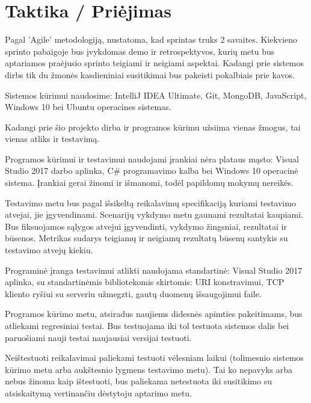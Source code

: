 \section{Taktika / Priėjimas}

Pagal 'Agile' metodologiją, nustatoma, kad sprintas truks 2 savaites.
Kiekvieno sprinto pabaigoje bus įvykdomas demo ir retrospektyvos,
kurių metu bus aptariamos praėjusio sprinto teigiami ir neigiami aspektai.
Kadangi prie sistemos dirbs tik du žmonės kasdieniniai susitikimai bus pakeisti pokalbiais prie kavos.

Sistemos kūrimui naudosime: IntelliJ IDEA Ultimate, Git, MongoDB, JavaScript, Windows 10 bei Ubuntu operacines sistemas.













Kadangi prie šio projekto dirba ir programos kūrimu užsiima vienas žmogus, tai vienas atliks ir testavimą.

Programos kūrimui ir testavimui naudojami įrankiai nėra plataus mąsto: Visual Studio 2017 darbo aplinka, C\# programavimo kalba bei Windows 10 operacinė sistema. 
Įrankiai gerai žinomi ir išmanomi, todėl papildomų mokymų nereikės. 

Testavimo metu bus pagal išsikeltą reikalavimų specifikaciją kuriami testavimo atvejai, jie įgyvendinami. 
Scenarijų vykdymo metu gaunami rezultatai kaupiami. 
Bus fiksuojamos sąlygos atvejui įgyvendinti, vykdymo žingsniai, rezultatai ir būsenos. 
Metrikas sudarys teigiamų ir neigiamų rezultatų būsenų santykis su testavimo atvejų kiekiu. 

Programinė įranga testavimui atlikti naudojama standartinė: Visual Studio 2017 aplinka, su standartinėmis bibliotekomis skirtomis: URI konstravimui, TCP kliento ryšiui su serveriu užmegzti, gautų duomenų išsaugojimui faile. 

Programos kūrimo metu, atsiradus naujiems didesnės apimties pakeitimams, bus atliekami regresiniai testai. 
Bus testuojama iki tol testuota sistemos dalis bei paruošiami nauji testai naujausiai versijai testuoti. 

Neištestuoti reikalavimai paliekami testuoti vėlesniam laikui (tolimesnio sistemos kūrimo metu arba aukštesnio lygmens testavimo metu). 
Tai ko nepavyks arba nebus žinoma kaip ištestuoti, bus paliekama netestuota iki susitikimo su atsiskaitymą vertinančiu dėstytoju aptarimo metu. 

